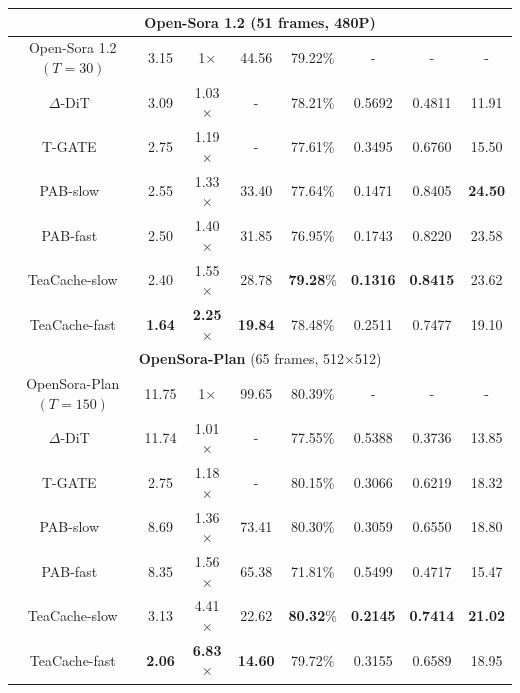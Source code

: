 \begin{table}[]
\begin{tabular}{c|ccc|cccc}
        
        \hline
        \hline
        \multicolumn{8}{c}{\textbf{Open-Sora 1.2} (51 frames, 480P)} \\
        \hline
        \rowcolor[gray]{0.9} Open-Sora 1.2 $(T = 30)$ & 3.15 & 1$\times$ & 44.56 & 79.22\% & - & - & - \\
        $\Delta$-DiT~\cite{chen2024delta} & 3.09 & 1.03$\times$ & - & 78.21\% & 0.5692 & 0.4811 & 11.91 \\
        T-GATE~\cite{zhang2024cross} & 2.75 & 1.19$\times$ & - & 77.61\% & 0.3495 & 0.6760 & 15.50 \\
        PAB-slow~\cite{zhao2024real} & 2.55 & 1.33$\times$ & 33.40  & 77.64\% & 0.1471 & 0.8405 &  \textbf{24.50} \\
        PAB-fast~\cite{zhao2024real} & 2.50 & 1.40$\times$ & 31.85 & 76.95\% & 0.1743 & 0.8220 &  23.58 \\
        \hline
        TeaCache-slow & 2.40 & 1.55$\times$ & 28.78 & \textbf{79.28}\% & \textbf{0.1316} & \textbf{0.8415} &23.62  \\
        TeaCache-fast & \textbf{1.64} & \textbf{2.25}$\times$ & \textbf{19.84} & 78.48\% & 0.2511 & 0.7477 & 19.10 \\

        

        \hline
        \hline
        \multicolumn{8}{c}{\textbf{OpenSora-Plan} (65 frames, 512$\times$512)} \\
        \hline
        \rowcolor[gray]{0.9} OpenSora-Plan $(T = 150)$ & 11.75 & 1$\times$ &99.65  & 80.39\% & - & - & - \\
        $\Delta$-DiT~\cite{chen2024delta} & 11.74 & 1.01$\times$ & - & 77.55\% & 0.5388 & 0.3736 & 13.85 \\
        T-GATE~\cite{zhang2024cross} & 2.75 & 1.18$\times$ & - & 80.15\% & 0.3066 & 0.6219 & 18.32 \\
        PAB-slow~\cite{zhao2024real} & 8.69 & 1.36$\times$ & 73.41  &80.30\% & 0.3059 & 0.6550 &  18.80 \\
        PAB-fast~\cite{zhao2024real} & 8.35 & 1.56$\times$ & 65.38 & 71.81\% & 0.5499 & 0.4717 &  15.47 \\
        \hline
        TeaCache-slow & 3.13 & 4.41$\times$ & 22.62 & \textbf{80.32}\% & \textbf{0.2145} & \textbf{0.7414} & \textbf{21.02}  \\
        TeaCache-fast & \textbf{2.06}  & \textbf{6.83}$\times$ & \textbf{14.60} & 79.72\% & 0.3155 & 0.6589 & 18.95 \\

        \bottomrule
    \end{tabular}
\end{table}



